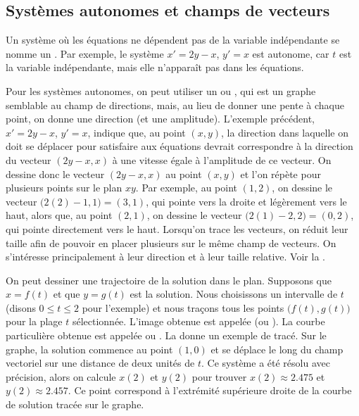 \subsection{Systèmes autonomes et champs de vecteurs}

Un système où les équations ne dépendent pas de la variable indépendante se nomme un \emph{}. Par exemple, le système $x'=2y-x$, $y'=x$ est autonome, car $t$ est la variable indépendante, mais elle n'apparaît pas dans les équations.

Pour les systèmes autonomes, on peut utiliser un
\emph{} ou \emph{},
qui est un graphe semblable au champ de directions, mais, au lieu de donner une pente à chaque point, on donne une direction (et une amplitude). L'exemple précédent, $x' = 2y-x$, $y' = x$, indique que, au point $(x,y)$, la direction dans laquelle on doit se déplacer pour satisfaire aux équations devrait correspondre à la direction du vecteur $( 2y-x, x )$
à une vitesse égale à l'amplitude de ce vecteur. On dessine donc le vecteur $(2y-x,x)$ au point $(x,y)$ et l'on répète pour plusieurs points sur le plan $xy$.
Par exemple, au point $(1,2)$, on dessine le vecteur
$\bigl(2(2)-1,1\bigr) = (3,1)$,
qui pointe vers la droite et légèrement vers le haut, alors que, au point $(2,1)$, on dessine le vecteur $\bigl(2(1)-2,2\bigr) = (0,2)$,
qui pointe directement vers le haut.
Lorsqu'on trace les vecteurs, on réduit leur taille afin de pouvoir en placer plusieurs sur le même champ de vecteurs. On s'intéresse principalement à leur direction et à leur taille relative. Voir la
.

On peut dessiner une trajectoire de la solution dans le plan. Supposons que $x = f(t)$ et que $y=g(t)$ est la solution. Nous choisissons un intervalle de $t$ (disons $0 \leq t \leq 2$ pour l'exemple) et nous traçons tous les points
$\bigl(f(t),g(t)\bigr)$ pour la plage $t$ sélectionnée. L'image obtenue est appelée \emph{}
(ou \emph{}).
La courbe particulière obtenue est appelée \emph{} ou \emph{}.
La  donne un exemple de tracé.
Sur le graphe, la solution commence au point $(1,0)$ et se déplace le long du champ vectoriel sur une distance de deux unités de $t$. Ce système a été résolu avec précision, alors on calcule $x(2)$ et $y(2)$ pour trouver
$x(2) \approx 2.475$ et $y(2) \approx 2.457$. Ce point correspond à l'extrémité supérieure droite de la courbe de solution tracée sur le graphe.

